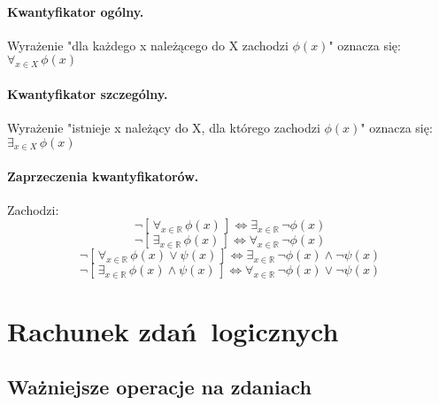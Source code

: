         \paragraph{Kwantyfikator ogólny.} Wyrażenie "dla każdego x należącego do X zachodzi $\phi(x)$" oznacza się: $\forall_{x \in X} \, \phi(x)$
        \paragraph{Kwantyfikator szczególny.} Wyrażenie "istnieje x należący do X, dla którego zachodzi $\phi(x)$" oznacza się: $\exists_{x \in X} \, \phi(x)$
        \paragraph{Zaprzeczenia kwantyfikatorów.} Zachodzi:
        \begin{equation*}
            \neg [\,\forall_{x \in \mathbb{R}} \, \phi(x)\,] \Leftrightarrow \exists_{x \in \mathbb{R}} \, \neg \phi(x)
        \end{equation*}
        \begin{equation*}
            \neg [\,\exists_{x \in \mathbb{R}} \, \phi(x)\,] \Leftrightarrow \forall_{x \in \mathbb{R}} \, \neg \phi(x)
        \end{equation*}
        \begin{equation*}
            \neg [\,\forall_{x \in \mathbb{R}} \, \phi(x) \vee \psi(x)\,] \Leftrightarrow \exists_{x \in \mathbb{R}} \, \neg \phi(x) \wedge \neg \psi(x)
        \end{equation*}
        \begin{equation*}
            \neg [\,\exists_{x \in \mathbb{R}} \, \phi(x) \wedge \psi(x)\,] \Leftrightarrow \forall_{x \in \mathbb{R}} \, \neg \phi(x) \vee \neg \psi(x)
        \end{equation*}

\section{Rachunek zdań logicznych}
    \subsection{Ważniejsze operacje na zdaniach}
